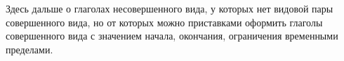 Здесь дальше о глаголах несовершенного вида, у которых нет видовой пары совершенного вида, но от которых можно приставками оформить глаголы совершенного вида с значением начала, окончания, ограничения временными пределами.




